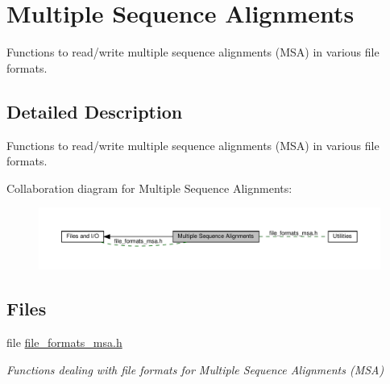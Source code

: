 \hypertarget{group__file__formats__msa}{}\section{Multiple Sequence Alignments}
\label{group__file__formats__msa}


Functions to read/write multiple sequence alignments (M\+SA) in various file formats.  




\subsection{Detailed Description}
Functions to read/write multiple sequence alignments (M\+SA) in various file formats. 

Collaboration diagram for Multiple Sequence Alignments\+:
\nopagebreak
\begin{figure}[H]
\begin{center}
\leavevmode
\includegraphics[width=350pt]{group__file__formats__msa}
\end{center}
\end{figure}
\subsection*{Files}
\begin{DoxyCompactItemize}
\item 
file \hyperlink{io_2file__formats__msa_8h}{file\+\_\+formats\+\_\+msa.\+h}
\begin{DoxyCompactList}\small\item\em Functions dealing with file formats for Multiple Sequence Alignments (M\+SA) \end{DoxyCompactList}\end{DoxyCompactItemize}
